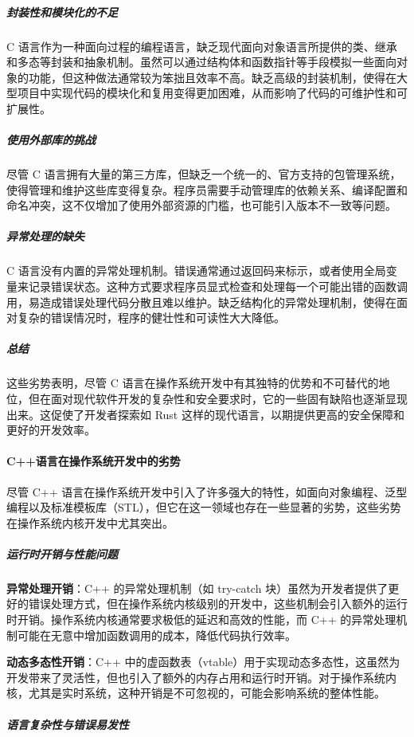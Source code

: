 \subparagraph{封装性和模块化的不足}

C 语言作为一种面向过程的编程语言，缺乏现代面向对象语言所提供的类、继承和多态等封装和抽象机制。虽然可以通过结构体和函数指针等手段模拟一些面向对象的功能，但这种做法通常较为笨拙且效率不高。缺乏高级的封装机制，使得在大型项目中实现代码的模块化和复用变得更加困难，从而影响了代码的可维护性和可扩展性。

\subparagraph{使用外部库的挑战}

尽管 C 语言拥有大量的第三方库，但缺乏一个统一的、官方支持的包管理系统，使得管理和维护这些库变得复杂。程序员需要手动管理库的依赖关系、编译配置和命名冲突，这不仅增加了使用外部资源的门槛，也可能引入版本不一致等问题。

\subparagraph{异常处理的缺失}

C 语言没有内置的异常处理机制。错误通常通过返回码来标示，或者使用全局变量来记录错误状态。这种方式要求程序员显式检查和处理每一个可能出错的函数调用，易造成错误处理代码分散且难以维护。缺乏结构化的异常处理机制，使得在面对复杂的错误情况时，程序的健壮性和可读性大大降低。

\subparagraph{总结}

这些劣势表明，尽管 C 语言在操作系统开发中有其独特的优势和不可替代的地位，但在面对现代软件开发的复杂性和安全要求时，它的一些固有缺陷也逐渐显现出来。这促使了开发者探索如 Rust 这样的现代语言，以期提供更高的安全保障和更好的开发效率。

\paragraph{C++语言在操作系统开发中的劣势}

尽管 C++ 语言在操作系统开发中引入了许多强大的特性，如面向对象编程、泛型编程以及标准模板库（STL），但它在这一领域也存在一些显著的劣势，这些劣势在操作系统内核开发中尤其突出。

\subparagraph{运行时开销与性能问题}

\textbf{异常处理开销}：C++ 的异常处理机制（如 try-catch 块）虽然为开发者提供了更好的错误处理方式，但在操作系统内核级别的开发中，这些机制会引入额外的运行时开销。操作系统内核通常要求极低的延迟和高效的性能，而 C++ 的异常处理机制可能在无意中增加函数调用的成本，降低代码执行效率。

\textbf{动态多态性开销}：C++ 中的虚函数表（vtable）用于实现动态多态性，这虽然为开发带来了灵活性，但也引入了额外的内存占用和运行时开销。对于操作系统内核，尤其是实时系统，这种开销是不可忽视的，可能会影响系统的整体性能。

\subparagraph{语言复杂性与错误易发性}

